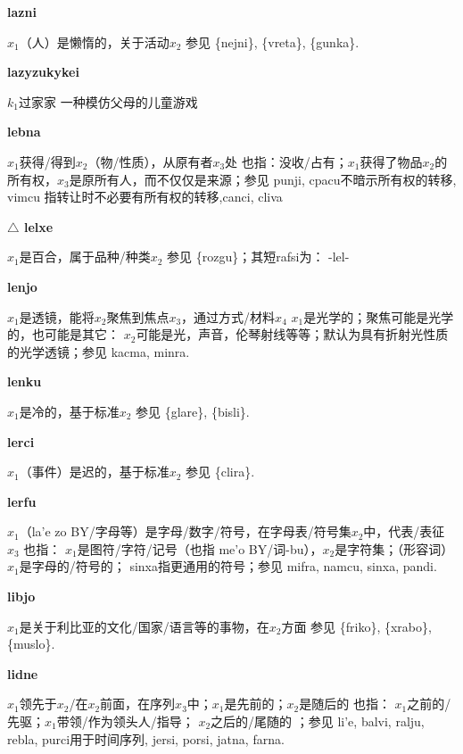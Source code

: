 \documentclass[notitlepage,twocolumn,a4paper,10pt]{book}
\begin{document}
{\sffamily\bfseries lazni} $x_1$（人）是懒惰的，关于活动$x_2$ \textemdash{} 参见 \{nejni\}, \{vreta\}, \{gunka\}.

{\sffamily\bfseries lazyzukykei} $k_1$过家家 \textemdash{} 一种模仿父母的儿童游戏

{\sffamily\bfseries lebna}\enspace {\ttfamily\bfseries[leb     le'a]}  $x_1$获得\slash{}得到$x_2$（物\slash{}性质），从原有者$x_3$处 \textemdash{} 也指：没收\slash{}占有；$x_1$获得了物品$x_2$的所有权，$x_3$是原所有人，而不仅仅是来源；参见 {punji}, {cpacu}不暗示所有权的转移, {vimcu} 指转让时不必要有所有权的转移,{canci}, {cliva}

{\sffamily\bfseries $\triangle$ lelxe} $x_1$是百合，属于品种\slash{}种类$x_2$ \textemdash{} 参见 \{rozgu\}；其短rafsi为： -lel-

{\sffamily\bfseries lenjo}\enspace {\ttfamily\bfseries[len     le'o]}  $x_1$是透镜，能将$x_2$聚焦到焦点$x_3$，通过方式\slash{}材料$x_4$ \textemdash{} $x_1$是光学的；聚焦可能是光学的，也可能是其它： $x_2$可能是光，声音，伦琴射线等等；默认为具有折射光性质的光学透镜；参见 {kacma}, {minra}.

{\sffamily\bfseries lenku}\enspace {\ttfamily\bfseries[lek]}  $x_1$是冷的，基于标准$x_2$ \textemdash{} 参见 \{glare\}, \{bisli\}.

{\sffamily\bfseries lerci}\enspace {\ttfamily\bfseries[lec]}  $x_1$（事件）是迟的，基于标准$x_2$ \textemdash{} 参见 \{clira\}.

{\sffamily\bfseries lerfu}\enspace {\ttfamily\bfseries[ler     le'u]}  $x_1$（la'e zo BY\slash{}字母等）是字母\slash{}数字\slash{}符号，在字母表\slash{}符号集$x_2$中，代表\slash{}表征$x_3$ \textemdash{} 也指： $x_1$是图符\slash{}字符\slash{}记号（也指 me'o BY\slash{}词-bu），$x_2$是字符集；（形容词）$x_1$是字母的\slash{}符号的； {sinxa}指更通用的符号；参见 {mifra}, {namcu}, {sinxa}, {pandi}.

{\sffamily\bfseries libjo}\enspace {\ttfamily\bfseries[lib]}  $x_1$是关于利比亚的文化\slash{}国家\slash{}语言等的事物，在$x_2$方面 \textemdash{} 参见 \{friko\}, \{xrabo\}, \{muslo\}.

{\sffamily\bfseries lidne}\enspace {\ttfamily\bfseries[        li'e]}  $x_1$领先于$x_2$\slash{}在$x_2$前面，在序列$x_3$中；$x_1$是先前的；$x_2$是随后的 \textemdash{} 也指： $x_1$之前的\slash{}先驱；$x_1$带领\slash{}作为领头人\slash{}指导； $x_2$之后的\slash{}尾随的 ；参见 {li'e}, {balvi}, {ralju}, {rebla}, {purci}用于时间序列, {jersi}, {porsi}, {jatna}, {farna}.
\end{document}
